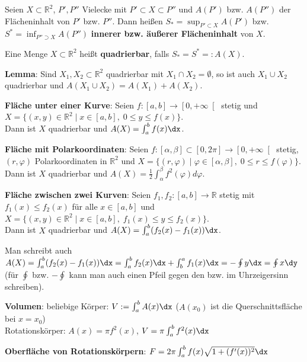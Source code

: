 Seien $X \subset \mathbb{R}^2$, $P', P''$ Vielecke mit
$P' \subset X \subset P''$ und $A(P')$ bzw. $A(P'')$ der Flächeninhalt
von $P'$ bzw. $P''$.
Dann heißen $S_\ast = \sup_{P' \subset X} A(P')$ bzw.
$S^\ast = \inf_{P'' \supset X} A(P'')$
\textbf{innerer bzw. äußerer Flächeninhalt} von $X$.

Eine Menge $X \subset \mathbb{R}^2$ heißt \textbf{quadrierbar}, falls
$S_\ast = S^\ast =: A(X)$.

\textbf{Lemma}: Sind $X_1, X_2 \subset \mathbb{R}^2$ quadrierbar mit
$X_1 \cap X_2 = \emptyset$, so ist auch $X_1 \cup X_2$ quadrierbar und
$A(X_1 \cup X_2) = A(X_1) + A(X_2)$.

\linie

\textbf{Fläche unter einer Kurve}:
Seien $f: [a,b] \rightarrow \left[0, +\infty\right[$ stetig und \\
$X = \{(x, y) \in \mathbb{R}^2 \;|\; x \in [a,b],\; 0 \le y \le f(x)\}$. \\
Dann ist $X$ quadrierbar und $A(X) = \int_a^b f(x)\dx$.

\textbf{Fläche mit Polarkoordinaten}:
Seien $f: [\alpha,\beta] \subset [0,2\pi] \rightarrow \left[0,+\infty\right[$
stetig, $(r, \varphi)$ Polarkoordinaten in $\mathbb{R}^2$ und
$X = \{(r, \varphi) \;|\;
\varphi \in [\alpha,\beta],\; 0 \le r \le f(\varphi)\}$. \\
Dann ist $X$ quadrierbar und
$A(X) = \frac{1}{2} \int_\alpha^\beta f^2(\varphi) d\varphi$.

\textbf{Fläche zwischen zwei Kurven}:
Seien $f_1, f_2: [a,b] \rightarrow \mathbb{R}$ stetig mit $f_1(x) \le f_2(x)$
für alle $x \in [a,b]$ und $X = \{(x,y) \in \mathbb{R}^2 \;|\; x \in [a,b],\;
f_1(x) \le y \le f_2(x)\}$. \\
Dann ist $X$ quadrierbar und $A(X) = \int_a^b (f_2(x) - f_1(x))\dx$.

Man schreibt auch $A(X) = \int_a^b (f_2(x) - f_1(x))\dx
= \int_a^b f_2(x)\dx + \int_b^a f_1(x)\dx = -\oint y\dx = \oint x\dy$
(für $\oint$ bzw. $-\oint$ kann man auch einen Pfeil gegen den bzw. im
Uhrzeigersinn schreiben).

\linie

\textbf{Volumen}:
beliebige Körper: $V := \int_a^b A(x)\dx$ ($A(x_0)$ ist die Querschnittsfläche
bei $x = x_0$) \\
Rotationskörper: $A(x) = \pi f^2(x)$, $V = \pi \int_a^b f^2(x)\dx$

\textbf{Oberfläche von Rotationskörpern}:
$F = 2\pi \int_a^b f(x) \sqrt{1 + (f'(x))^2}\dx$

